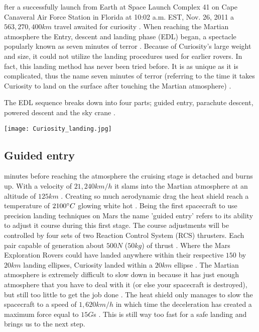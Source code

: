 fter a successfully launch from Earth at Space Launch Complex 41 on Cape Canaveral Air Force Station in Florida at 10:02 a.m. EST, Nov. 26, 2011 a $563,270,400km$ travel awaited for curiosity \cite{MissionTimeline} \cite{CNNCuriosity}.
When reaching the Martian atmosphere the Entry, descent and landing phase (EDL) began, a spectacle popularly known as seven minutes of terror \cite{CNNCuriosity}.
Because of Curiosity's large weight and size, it could not utilize the landing procedures used for earlier rovers.
In fact, this landing method has never been tried before.
It is as unique as it is complicated, thus the name seven minutes of terror (referring to the time it takes Curiosity to land on the surface after touching the Martian atmosphere) \cite{CNN_7minterror}.

The EDL sequence breaks down into four parts; guided entry, parachute descent, powered descent and the sky crane \cite{NASALanding}.

\begin{center}
\texttt{[image: Curiosity\_landing.jpg]}
\end{center}


\subsection*{Guided entry}
 minutes before reaching the atmosphere the cruising stage is detached and burns up.
With a velocity of $21,240km/h$ it slams into the Martian atmosphere at an altitude of $125km$ \cite{NASALanding_diag}.
Creating so much aerodynamic drag the heat shield reach a temperature of $2100\degree C$ glowing white hot \cite{NASALanding} \cite{NASA_youtube}.
Being the first spacecraft to use precision landing techniques on Mars the name 'guided entry' refers to its ability to adjust it course during this first stage.
The course adjustments will be controlled by four sets of two Reaction Control System (RCS) thrusters.
Each pair capable of generation about $500N$ ($50kg$) of thrust \cite{HistoricLanding}.
Where the Mars Exploration Rovers could have landed anywhere within their respective $150$ by $20km$ landing ellipses, Curiosity landed within a $20km$ ellipse \cite{NASALanding}.
The Martian atmosphere is extremely difficult to slow down in because it has just enough atmosphere that you have to deal with it (or else your spacecraft is destroyed), but still too little to get the job done \cite{NASA_youtube}.
The heat shield only manages to slow the spacecraft to a speed of $1,620km/h$ in which time the deceleration has created a maximum force equal to $15G$s \cite{NASALanding} \cite{HistoricLanding}.
This is still way too fast for a safe landing and brings us to the next step.

